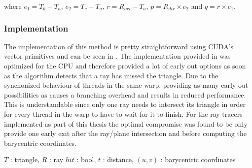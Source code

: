 where $e_1 = T_b - T_a$, $e_2 = T_c - T_a$, $r = R_{ori} - T_a$, $p = R_{dir} \times  e_2$
and $q = r \times  e_1$.

\subsubsection{Implementation}

The implementation of this method is pretty straightforward using CUDA's vector
primitives and can be seen in . The implementation
provided in  was optimized for the CPU and therefore
provided a lot of early out options as soon as the algorithm detects that a ray
has missed the triangle. Due to the synchonized behaviour of threads in the same
warp, providing as many early out possibilities as 
causes a branching overhead and results in reduced performance. This is
understandable since only one ray needs to intersect its triangle in order for
every thread in the warp to have to wait for it to finish. For the ray tracers
implemented as part of this thesis the optimal compromise was found to be only
provide one early exit after the ray/plane intersection and before computing the
barycentric coordinates.

\begin{algorithm}
  \caption{Möller-Trumbore ray/triangle intersection test}
  \label{alg:moellerTrumbore}
  \begin{algorithmic}
              {$T$ : triangle, $R$ : ray}
              {$hit$ : bool, $t$ : distance, $(u,v)$ : barycentric coordinates}
              {
                \ELSE
                \ENDIF
              }
  \end{algorithmic}
\end{algorithm}


